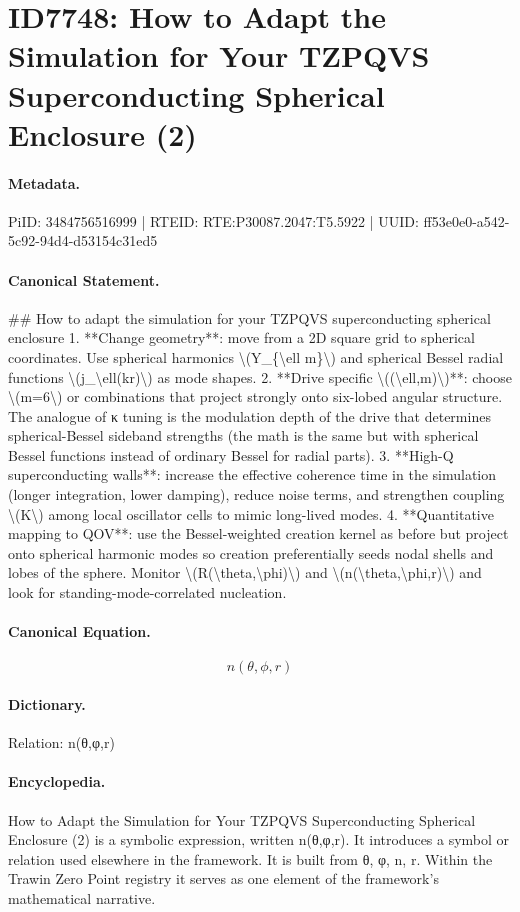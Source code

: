 \section*{ID7748: How to Adapt the Simulation for Your TZPQVS Superconducting Spherical Enclosure (2)}
\paragraph{Metadata.}
PiID: 3484756516999 | RTEID: RTE:P30087.2047:T5.5922 | UUID: ff53e0e0-a542-5c92-94d4-d53154c31ed5

\paragraph{Canonical Statement.}
\#\# How to adapt the simulation for your TZPQVS superconducting spherical enclosure 1. **Change geometry**: move from a 2D square grid to spherical coordinates. Use spherical harmonics \textbackslash{}(Y\_\{\textbackslash{}ell m\}\textbackslash{}) and spherical Bessel radial functions \textbackslash{}(j\_\textbackslash{}ell(kr)\textbackslash{}) as mode shapes. 2. **Drive specific \textbackslash{}((\textbackslash{}ell,m)\textbackslash{})**: choose \textbackslash{}(m=6\textbackslash{}) or combinations that project strongly onto six-lobed angular structure. The analogue of κ tuning is the modulation depth of the drive that determines spherical-Bessel sideband strengths (the math is the same but with spherical Bessel functions instead of ordinary Bessel for radial parts). 3. **High-Q superconducting walls**: increase the effective coherence time in the simulation (longer integration, lower damping), reduce noise terms, and strengthen coupling \textbackslash{}(K\textbackslash{}) among local oscillator cells to mimic long-lived modes. 4. **Quantitative mapping to QOV**: use the Bessel-weighted creation kernel as before but project onto spherical harmonic modes so creation preferentially seeds nodal shells and lobes of the sphere. Monitor \textbackslash{}(R(\textbackslash{}theta,\textbackslash{}phi)\textbackslash{}) and \textbackslash{}(n(\textbackslash{}theta,\textbackslash{}phi,r)\textbackslash{}) and look for standing-mode-correlated nucleation.

\paragraph{Canonical Equation.}
\[
n(\theta,\phi,r)
\]

\paragraph{Dictionary.}
Relation: n(θ,φ,r)

\paragraph{Encyclopedia.}
How to Adapt the Simulation for Your TZPQVS Superconducting Spherical Enclosure (2) is a symbolic expression, written n(θ,φ,r). It introduces a symbol or relation used elsewhere in the framework. It is built from θ, φ, n, r. Within the Trawin Zero Point registry it serves as one element of the framework's mathematical narrative.
